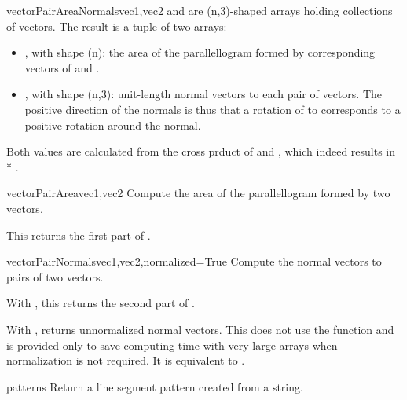 {{\begin{funcdesc}{vectorPairAreaNormals}{vec1,vec2}
 and  are (n,3)-shaped arrays holding collections of vectors. 
The result is a tuple of two arrays:
\begin{itemize}
\item {}, with shape (n): the area of the parallellogram formed by corresponding vectors of  and .
\item {}, with shape (n,3): unit-length normal vectors to each pair of vectors. The positive direction of the normals is thus that a rotation of  to  corresponds to a positive rotation around the normal.
\end{itemize}
Both values are calculated from the cross prduct of  and , which indeed results in  * .
\end{funcdesc}

\begin{funcdesc}{vectorPairArea}{vec1,vec2}
Compute the area of the parallellogram formed by two vectors.

This returns the first part of .
\end{funcdesc}

\begin{funcdesc}{vectorPairNormals}{vec1,vec2,normalized=True}
Compute the normal vectors to pairs of two vectors.

With , this returns the second part of .

With , returns unnormalized normal vectors. This does not use the  function and is provided only to save computing time with very large arrays when normalization is not required. It is equivalent to .

\end{funcdesc}


\begin{funcdesc}{pattern}{s}
Return a line segment pattern created from a string.


\end{funcdesc}}}
